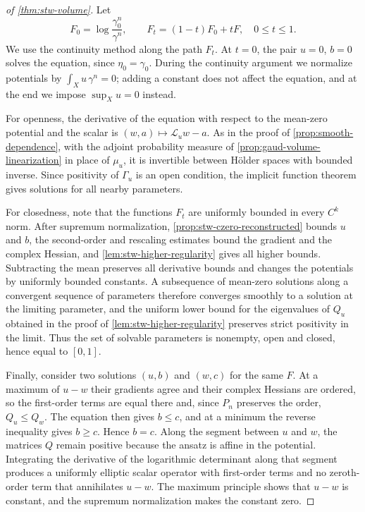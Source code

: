 \begin{proof}[of \cref{thm:stw-volume}]
Let
\[
 F_0=\log\frac{\gamma_0^n}{\gamma^n},\qquad
 F_t=(1-t)F_0+tF,\quad0\leq t\leq1.
\]
We use the continuity method along the path $F_t$. At $t=0$, the pair $u=0$, $b=0$ solves the equation, since $\eta_0=\gamma_0$. During the continuity argument we normalize potentials by $\int_Xu\,\gamma^n=0$; adding a constant does not affect the equation, and at the end we impose $\sup_Xu=0$ instead.

For openness, the derivative of the equation with respect to the mean-zero potential and the scalar is $(w,a)\mapsto\mathcal L_uw-a$. As in the proof of \cref{prop:smooth-dependence}, with the adjoint probability measure of \cref{prop:gaud-volume-linearization} in place of $\mu_u$, it is invertible between H\"older spaces with bounded inverse. Since positivity of $\Gamma_u$ is an open condition, the implicit function theorem gives solutions for all nearby parameters.

For closedness, note that the functions $F_t$ are uniformly bounded in every $C^k$ norm. After supremum normalization, \cref{prop:stw-czero-reconstructed} bounds $u$ and $b$, the second-order and rescaling estimates bound the gradient and the complex Hessian, and \cref{lem:stw-higher-regularity} gives all higher bounds. Subtracting the mean preserves all derivative bounds and changes the potentials by uniformly bounded constants. A subsequence of mean-zero solutions along a convergent sequence of parameters therefore converges smoothly to a solution at the limiting parameter, and the uniform lower bound for the eigenvalues of $Q_u$ obtained in the proof of \cref{lem:stw-higher-regularity} preserves strict positivity in the limit. Thus the set of solvable parameters is nonempty, open and closed, hence equal to $[0,1]$.

Finally, consider two solutions $(u,b)$ and $(w,c)$ for the same $F$. At a maximum of $u-w$ their gradients agree and their complex Hessians are ordered, so the first-order terms are equal there and, since $P_n$ preserves the order, $Q_u\leq Q_w$. The equation then gives $b\leq c$, and at a minimum the reverse inequality gives $b\geq c$. Hence $b=c$. Along the segment between $u$ and $w$, the matrices $Q$ remain positive because the ansatz is affine in the potential. Integrating the derivative of the logarithmic determinant along that segment produces a uniformly elliptic scalar operator with first-order terms and no zeroth-order term that annihilates $u-w$. The maximum principle shows that $u-w$ is constant, and the supremum normalization makes the constant zero.
\end{proof}
